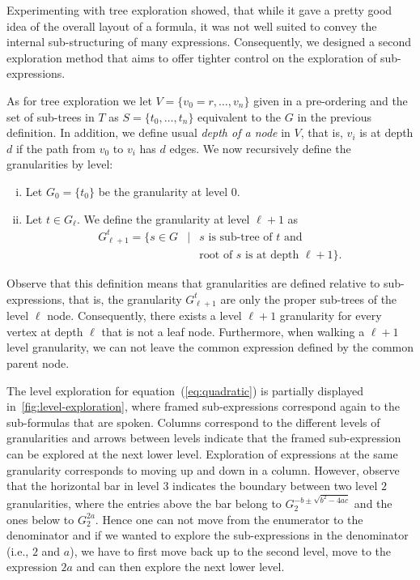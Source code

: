 \documentclass{sig-alternate}
\begin{document}
Experimenting with tree exploration showed, that while it gave a pretty good
idea of the overall layout of a formula, it was not well suited to convey the
internal sub-structuring of many expressions. Consequently, we designed a second
exploration method that aims to offer tighter control on the exploration of
sub-expressions.

As for tree exploration we let $V=\{v_0=r,\ldots,v_n\}$ given in a pre-ordering
and the set of sub-trees in $T$ as $S=\{t_0,\ldots, t_n\}$ equivalent to the $G$
in the previous definition. In addition, we define usual \emph{depth of a node}
in $V$, that is, $v_i$ is at depth $d$ if the path from $v_0$ to $v_i$ has $d$
edges. We now recursively define the granularities by level:
\begin{enumerate}[(i)]
\item Let $G_0=\{t_0\}$ be the granularity at level $0$.
\item Let $t\in G_\ell$. We define the granularity at level $\ell + 1$ as
  \begin{eqnarray*}
    G^t_{\ell+1} = \{s\in G & | & s \mbox{ is sub-tree of } t\mbox{ and }\\ 
    & & \mbox{root of } s \mbox{ is at depth } \ell+1\}.
  \end{eqnarray*}
\end{enumerate}
Observe that this definition means that granularities are defined relative to
sub-expressions, that is, the granularity $G^t_{\ell+1}$ are only the proper
sub-trees of the level $\ell$ node. Consequently, there exists a level $\ell+1$
granularity for every vertex at depth $\ell$ that is not a leaf
node. Furthermore, when walking a $\ell+1$ level granularity, we can not leave
the common expression defined by the common parent node.

The level exploration for equation~(\ref{eq:quadratic}) is partially
displayed in~\ref{fig:level-exploration}, where framed sub-expressions correspond
again to the sub-formulas that are spoken. Columns correspond to the different
levels of granularities and arrows between levels indicate that the framed
sub-expression can be explored at the next lower level. Exploration of
expressions at the same granularity corresponds to moving up and down in a
column. However, observe that the horizontal bar in level $3$ indicates the
boundary between two level $2$ granularities, where the entries above the bar
belong to $G^{-b\pm\sqrt{b^2-4ac}}_2$ and the ones below to $G^{2a}_2$. Hence one
can not move from the enumerator to the denominator and if we wanted to explore
the sub-expressions in the denominator (i.e., $2$ and $a$), we have to first move
back up to the second level, move to the expression $2a$ and can then explore
the next lower level.
\end{document}

